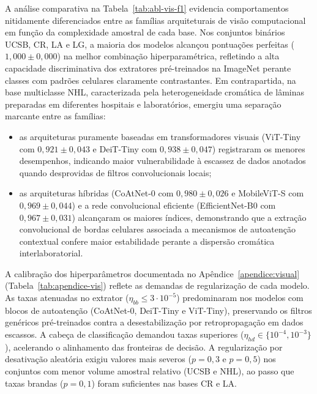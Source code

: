 A análise comparativa na Tabela~\ref{tab:abl-vis-f1} evidencia comportamentos nitidamente diferenciados entre as famílias arquiteturais de visão computacional em função da complexidade amostral de cada base. Nos conjuntos binários UCSB, CR, LA e LG, a maioria dos modelos alcançou pontuações perfeitas ($1{,}000 \pm 0{,}000$) na melhor combinação hiperparamétrica, refletindo a alta capacidade discriminativa dos extratores pré-treinados na ImageNet perante classes com padrões celulares claramente contrastantes. Em contrapartida, na base multiclasse NHL, caracterizada pela heterogeneidade cromática de lâminas preparadas em diferentes hospitais e laboratórios, emergiu uma separação marcante entre as famílias:
\begin{itemize}
    \item as arquiteturas puramente baseadas em transformadores visuais (ViT-Tiny com $0{,}921 \pm 0{,}043$ e DeiT-Tiny com $0{,}938 \pm 0{,}047$) registraram os menores desempenhos, indicando maior vulnerabilidade à escassez de dados anotados quando desprovidas de filtros convolucionais locais;
    \item as arquiteturas híbridas (CoAtNet-0 com $0{,}980 \pm 0{,}026$ e MobileViT-S com $0{,}969 \pm 0{,}044$) e a rede convolucional eficiente (EfficientNet-B0 com $0{,}967 \pm 0{,}031$) alcançaram os maiores índices, demonstrando que a extração convolucional de bordas celulares associada a mecanismos de autoatenção contextual confere maior estabilidade perante a dispersão cromática interlaboratorial.
\end{itemize}

A calibração dos hiperparâmetros documentada no Apêndice~\ref{apendice:visual} (Tabela~\ref{tab:apendice-vis}) reflete as demandas de regularização de cada modelo. As taxas atenuadas no extrator ($\eta_{bb} \leq 3\cdot 10^{-5}$) predominaram nos modelos com blocos de autoatenção (CoAtNet-0, DeiT-Tiny e ViT-Tiny), preservando os filtros genéricos pré-treinados contra a desestabilização por retropropagação em dados escassos. A cabeça de classificação demandou taxas superiores ($\eta_{hd} \in \{10^{-4}, 10^{-3}\}$), acelerando o alinhamento das fronteiras de decisão. A regularização por desativação aleatória exigiu valores mais severos ($p = 0{,}3$ e $p = 0{,}5$) nos conjuntos com menor volume amostral relativo (UCSB e NHL), ao passo que taxas brandas ($p = 0{,}1$) foram suficientes nas bases CR e LA.

